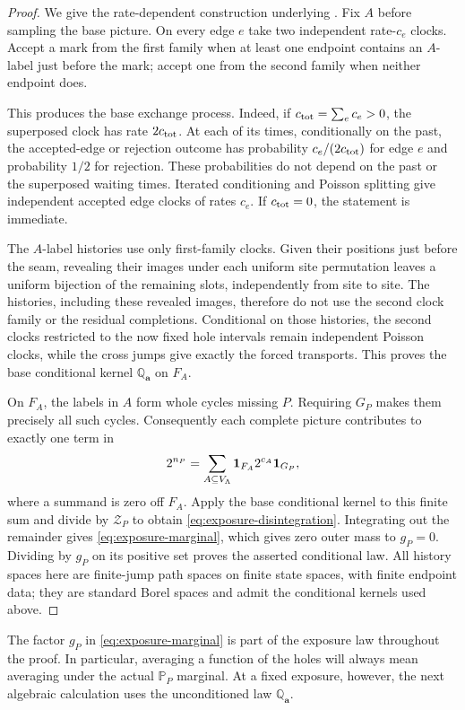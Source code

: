 \begin{proof}
We give the rate-dependent construction underlying
\cite[Proposition~4.1]{Ordering}.  Fix $A$ before sampling the base
picture.  On every edge $e$ take two independent rate-$c_e$ clocks.
Accept a mark from the first family when at least one endpoint
contains an $A$-label just before the mark; accept one from the second
family when neither endpoint does.

This produces the base exchange process.  Indeed, if
$c_{\rm tot}=\sum_ec_e>0$, the superposed clock has rate
$2c_{\rm tot}$.  At each of its times, conditionally on the past,
the accepted-edge or rejection outcome has probability
$c_e/(2c_{\rm tot})$ for edge $e$ and probability $1/2$ for
rejection.  These probabilities do not depend on the past or the
superposed waiting times.  Iterated conditioning and Poisson splitting
give independent accepted edge clocks of rates $c_e$.  If
$c_{\rm tot}=0$, the statement is immediate.

The $A$-label histories use only first-family clocks.  Given their
positions just before the seam, revealing their images under each
uniform site permutation leaves a uniform bijection of the remaining
slots, independently from site to site.  The histories, including
these revealed images, therefore do not use the second clock family
or the residual completions.  Conditional on those histories, the
second clocks restricted to the now fixed hole intervals remain
independent Poisson clocks, while the cross jumps give exactly the
forced transports.  This proves the base conditional kernel
$\mathbb Q_{\mathbf a}$ on $F_A$.

On $F_A$, the labels in $A$ form whole cycles missing $P$.  Requiring
$G_P$ makes them precisely all such cycles.  Consequently each
complete picture contributes to exactly one term in
\[
                    2^{n_P}
        =\sum_{A\subseteq V_\Lambda}\mathbf1_{F_A}2^{c_A}\mathbf1_{G_P},
\]
where a summand is zero off $F_A$.  Apply the base conditional kernel
to this finite sum and divide by $\mathcal Z_P$ to obtain
\eqref{eq:exposure-disintegration}.  Integrating out the remainder
gives \eqref{eq:exposure-marginal}, which gives zero outer mass to
$g_P=0$.  Dividing by $g_P$ on its positive set proves the asserted
conditional law.  All history spaces here are finite-jump path spaces
on finite state spaces, with finite endpoint data; they are standard
Borel spaces and admit the conditional kernels used above.
\end{proof}

The factor $g_P$ in \eqref{eq:exposure-marginal} is part of the
exposure law throughout the proof.  In particular, averaging a function
of the holes will always mean averaging under the actual $\mathbb P_P$
marginal.  At a fixed exposure, however, the next algebraic calculation
uses the unconditioned law $\mathbb Q_{\mathbf a}$.

